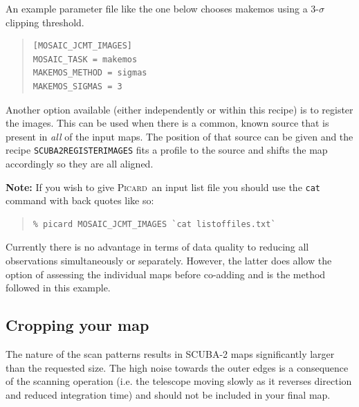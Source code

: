 \documentclass[twoside,11pt]{article}
\newcommand{\xref}[3]{#1}
\newcommand{\xlabel}[1]{}
\renewcommand{\_}{\texttt{\symbol{95}}}
\newenvironment{myquote}{\begin{quote}\begin{small}}{\end{small}\end{quote}}
\newcommand{\picard}{\xref{\textsc{Picard}}{sun265}{}}
\newcommand{\drrecipe}[1]{\texttt{#1}}
\newcommand{\task}[1]{\textsf{#1}}
\begin{document}
An example parameter file like the one below chooses \task{makemos}
using a 3-$\sigma$ clipping threshold.
\begin{myquote}
\begin{verbatim}
[MOSAIC_JCMT_IMAGES]
MOSAIC_TASK = makemos
MAKEMOS_METHOD = sigmas
MAKEMOS_SIGMAS = 3
\end{verbatim}
\end{myquote}
Another option available (either independently or within this recipe)
is to register the images. This can be used when there is a common,
known source that is present in \emph{all} of the input maps. The
position of that source can be given and the recipe
\xref{\drrecipe{SCUBA2\_REGISTER\_IMAGES}}{sun265}{SCUBA2_REGISTER_IMAGES}
fits a profile to the source and shifts the map accordingly so they
are all aligned.

\textbf{Note:} If you wish to give \picard\ an input list file you should
use the \texttt{cat} command with back quotes like so:
\begin{myquote}
\begin{verbatim}
% picard MOSAIC_JCMT_IMAGES `cat listoffiles.txt`
\end{verbatim}
\end{myquote}


Currently there is no advantage in terms of data quality to reducing
all observations simultaneously or separately. However, the latter
does allow the option of assessing the individual maps before co-adding
and is the method followed in this example.

\subsection{\xlabel{crop}Cropping your map}
\label{sec:crop}

The nature of the scan patterns results in SCUBA-2 maps significantly
larger than the requested size. The high noise towards the outer edges
is a consequence of the scanning operation (i.e. the telescope moving
slowly as it reverses direction and reduced integration time) and
should not be included in your final map.
\end{document}
